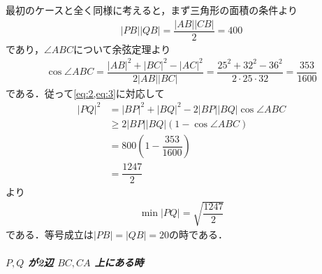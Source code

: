 \documentclass[../../main.tex]{subfiles}
\begin{document}
最初のケースと全く同様に考えると，まず三角形の面積の条件より
\begin{align}
  |PB||QB| = \dfrac{|AB||CB|}{2} = 400
\end{align}
であり，$\angle ABC$について余弦定理より
\begin{align}
  \cos \angle ABC = \dfrac{|AB|^2+|BC|^2-|AC|^2}{2|AB||BC|} = \dfrac{25^2+32^2-36^2}{2\cdot 25\cdot 32} = \dfrac{353}{1600}
\end{align}
である．従って\cref{eq:2,eq:3}に対応して
\begin{align}
  |PQ|^2
  &= |BP|^2 + |BQ|^2 - 2 |BP||BQ| \cos \angle ABC \\
  &\ge 2|BP||BQ| \left(1-\cos \angle ABC\right) \\
  &= 800\left(1-\dfrac{353}{1600}\right) \\
  &=\dfrac{1247}{2}
\end{align}
より
\begin{align}
  \min |PQ| = \sqrt{\dfrac{1247}{2}} \label{eq:6}
\end{align}
である．等号成立は$|PB|=|QB|=20$の時である．

\subparagraph{$P, Q$ が2辺 $BC, CA$ 上にある時}
\end{document}

